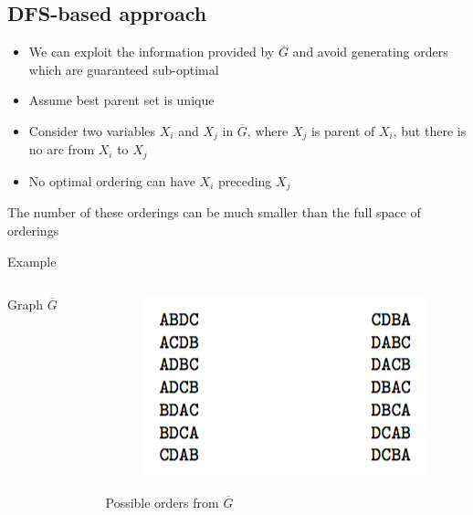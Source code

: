 \subsection{DFS-based approach}
	\begin{frame}
		\begin{itemize}
			\item We can exploit the information provided by $\overline G$ and avoid generating orders which are guaranteed sub-optimal
			\item Assume \alert{best parent set} is unique
			\item Consider two variables $X_i$ and $X_j$ in $\overline G$, where $X_j$ is parent of $X_i$, but there is no arc from $X_i$ to $X_j$
			\item No optimal ordering can have $X_i$ preceding $X_j$
		\end{itemize}
		The number of these orderings can be much smaller than the full space of orderings
	\end{frame}
	\begin{frame}{Example}
		\begin{columns}
			\begin{column}{.48\textwidth}
				\begin{figure}
					\centering
					
				\end{figure}
				\centering
				Graph $\overline G$
			\end{column}
			\begin{column}{.48\textwidth}
				\begin{figure}
					\centering
					\includegraphics{images/dfsorders}
				\end{figure}
				\centering
				Possible orders from $\overline G$
			\end{column}
		\end{columns}
	\end{frame}
